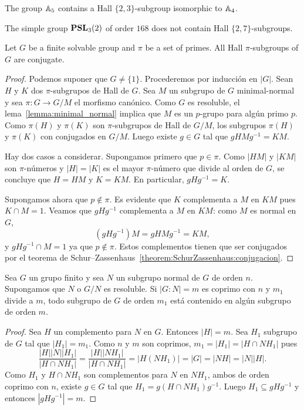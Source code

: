 \begin{example}
	The group $\mathbb{A}_5$ contains a Hall $\{2,3\}$-subgroup isomorphic to 	$\mathbb{A}_4$.
\end{example}

\begin{example}
	The simple group $\mathbf{PSL}_3(2)$ of order $168$ does not contain Hall $\{2,7\}$-subgroups. 
\end{example}


\begin{theorem}[Hall]
	\label{thm:HallC}
	Let $G$ be a finite solvable group and $\pi$ be a set of primes. All 
	Hall $\pi$-subgroups of $G$ are conjugate. 
\end{theorem}

\begin{proof}
	Podemos suponer que $G\ne\{1\}$. Procederemos por inducción en $|G|$.  Sean $H$
	y $K$ dos $\pi$-subgrupos de Hall de $G$. Sea $M$ un subgrupo de $G$
	minimal-normal y sea $\pi\colon G\to G/M$ el morfismo canónico. Como $G$ es
	resoluble, el lema~\ref{lemma:minimal_normal} implica que  $M$ es un
	$p$-grupo para algún primo $p$.  Como $\pi(H)$ y $\pi(K)$ son
	$\pi$-subgrupos de Hall de $G/M$, los subgrupos $\pi(H)$ y $\pi(K)$ con
	conjugados en $G/M$. Luego existe $g\in G$ tal que $gHMg^{-1}=KM$. 

	Hay dos casos a considerar. Supongamos primero que $p\in\pi$. Como $|HM|$ y
	$|KM|$ son $\pi$-números y $|H|=|K|$ es el mayor $\pi$-número que divide al
	orden de $G$, se concluye que $H=HM$ y $K=KM$. En particular, $gHg^{-1}=K$. 

	Supongamos ahora que $p\not\in\pi$. Es evidente que $K$ complementa a $M$ en
	$KM$ pues $K\cap M=1$. Veamos que $gHg^{-1}$ complementa a $M$ en $KM$:
	como $M$ es normal en $G$, 
	\[
	(gHg^{-1})M=gHMg^{-1}=KM,
	\]
	y $gHg^{-1}\cap M=1$ ya que $p\not\in\pi$. Estos complementos tienen que
	ser conjugados por el teorema de
	Schur--Zassenhaus~\ref{theorem:SchurZassenhaus:conjugacion}.
\end{proof}

\begin{corollary}
	Sea $G$ un grupo finito y sea $N$ un subgrupo normal de $G$ de orden $n$.
	Supongamos que $N$ o $G/N$ es resoluble. Si $|G:N|=m$ es coprimo con $n$ y
	$m_1$ divide a $m$, todo subgrupo de $G$ de orden $m_1$ está contenido en
	algún subgrupo de orden $m$.
\end{corollary}

\begin{proof}
	Sea $H$ un complemento para $N$ en $G$. Entonces $|H|=m$. Sea $H_1$
	subgrupo de $G$ tal que $|H_1|=m_1$. 
	Como $n$ y $m$ son coprimos, $m_1=|H_1|=|H\cap NH_1|$ pues
	\[
	\frac{|H||N||H_1|}{|H\cap NH_1|}=
	\frac{|H||NH_1|}{|H\cap NH_1|}=|H(NH_1)|=|G|=|NH|=|N||H|.
	\]
	Como $H_1$ y $H\cap NH_1$ son complementos para $N$ en $NH_1$, ambos de
	orden coprimo con $n$, existe $g\in G$ tal que $H_1=g(H\cap NH_1)g^{-1}$. Luego 
	$H_1\subseteq gHg^{-1}$ y entonces $|gHg^{-1}|=m$. 
\end{proof}

